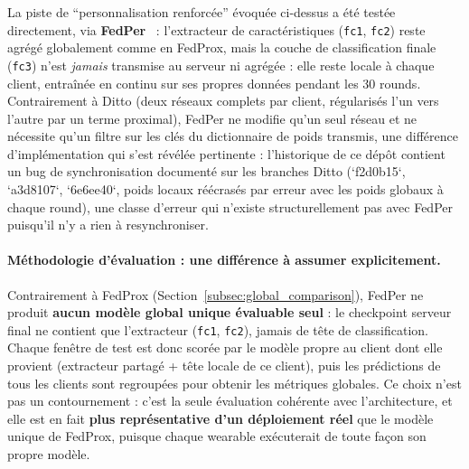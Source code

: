 \documentclass{article}
\begin{document}
La piste de ``personnalisation renforcée'' évoquée ci-dessus a été testée directement,
via \textbf{FedPer}~\cite{arivazhagan2019federated} : l'extracteur de caractéristiques
(\texttt{fc1}, \texttt{fc2}) reste agrégé globalement comme en FedProx, mais la couche
de classification finale (\texttt{fc3}) n'est \emph{jamais} transmise au serveur ni
agrégée : elle reste locale à chaque client, entraînée en continu sur ses propres
données pendant les 30 rounds. Contrairement à Ditto (deux réseaux complets par client,
régularisés l'un vers l'autre par un terme proximal), FedPer ne modifie qu'un seul
réseau et ne nécessite qu'un filtre sur les clés du dictionnaire de poids transmis,
une différence d'implémentation qui s'est révélée pertinente : l'historique de ce dépôt
contient un bug de synchronisation documenté sur les branches Ditto (`f2d0b15`,
`a3d8107`, `6e6ee40`, poids locaux réécrasés par erreur avec les poids globaux à
chaque round), une classe d'erreur qui n'existe structurellement pas avec FedPer
puisqu'il n'y a rien à resynchroniser.

\paragraph{Méthodologie d'évaluation : une différence à assumer explicitement.}
Contrairement à FedProx (Section~\ref{subsec:global_comparison}), FedPer ne produit
\textbf{aucun modèle global unique évaluable seul} : le checkpoint serveur final ne
contient que l'extracteur (\texttt{fc1}, \texttt{fc2}), jamais de tête de classification.
Chaque fenêtre de test est donc scorée par le modèle propre au client dont elle provient
(extracteur partagé + tête locale de ce client), puis les prédictions de tous les
clients sont regroupées pour obtenir les métriques globales. Ce choix n'est pas un
contournement : c'est la seule évaluation cohérente avec l'architecture, et elle est en
fait \textbf{plus représentative d'un déploiement réel} que le modèle unique de FedProx,
puisque chaque wearable exécuterait de toute façon son propre modèle.
\end{document}
